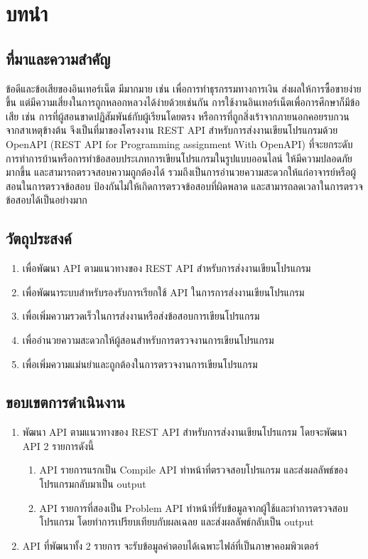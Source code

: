 \chapter{บทนำ}
\label{chapter1}

\section{ที่มาและความสำคัญ}
    ข้อดีและข้อเสียของอินเทอร์เน็ต มีมากมาย เช่น เพื่อการทําธุรกรรมทางการเงิน ส่งผล\mbox{ให้}การซื้อขายง่ายขึ้น แต่มีความเสี่ยงในการถูกหลอกหลวงได้ง่ายด้วยเช่นกัน การใช้งานอินเทอร์เน็ตเพื่อการศึกษาก็มีข้อเสีย เช่น การที่ผู้สอนขาดปฏิสัมพันธ์กับผู้เรียนโดยตรง หรือการที่ถูกสิ่งเร้าจากภายนอกคอย\mbox{รบกวน} จากสาเหตุข้างต้น จึงเป็นที่มาของโครงงาน REST API สําหรับการส่งงานเขียนโปรแกรมด้วย OpenAPI (REST API for Programming assignment With OpenAPI) ที่จะยกระดับการทําการบ้านหรือการทําข้อสอบประเภทการเขียนโปรแกรมในรูปแบบออนไลน์ ให้มีความปลอดภัยมากขึ้น และสามารถตรวจสอบความถูกต้องได้ รวมถึงเป็นการอํานวยความสะดวกให้แก่อาจารย์หรือผู้สอนในการตรวจข้อสอบ ป้องกันไม่ให้เกิดการตรวจข้อสอบที่ผิดพลาด และสามารถลดเวลาในการตรวจข้อสอบได้เป็นอย่างมาก

\section{วัตถุประสงค์}
\begin{enumerate}
    \item เพื่อพัฒนา API ตามแนวทางของ REST API สําหรับการส่งงานเขียนโปรแกรม
    \item เพื่อพัฒนาระบบสําหรับรองรับการเรียกใช้ API ในการการส่งงานเขียนโปรแกรม
    \item เพื่อเพิ่มความรวดเร็วในการส่งงานหรือส่งข้อสอบการเขียนโปรแกรม
    \item เพื่ออํานวยความสะดวกให้ผู้สอนสําหรับการตรวจงานการเขียนโปรแกรม
    \item เพื่อเพิ่มความแม่นยําและถูกต้องในการตรวจงานการเขียนโปรแกรม
\end{enumerate}


\section{ขอบเขตการดำเนินงาน}
\begin{enumerate}
    \item พัฒนา API ตามแนวทางของ REST API สําหรับการส่งงานเขียนโปรแกรม โดยจะพัฒนา API 2 รายการดังนี้
    \begin{enumerate}
        \item API รายการแรกเป็น Compile API ทําหน้าที่ตรวจสอบโปรแกรม และส่งผลลัพธ์ของโปรแกรมกลับมาเป็น output
        \item API รายการที่สองเป็น Problem API  ทําหน้าที่รับข้อมูลจากผู้ใช้และทําการตรวจสอบโปรแกรม โดยทําการเปรียบเทียบกับผลเฉลย และส่งผลลัพธ์กลับเป็น output
    \end{enumerate}        
    \item API ที่พัฒนาทั้ง 2 รายการ จะรับข้อมูลคําตอบได้เฉพาะไฟล์ที่เป็นภาษาคอมพิวเตอร์
\end{enumerate}
